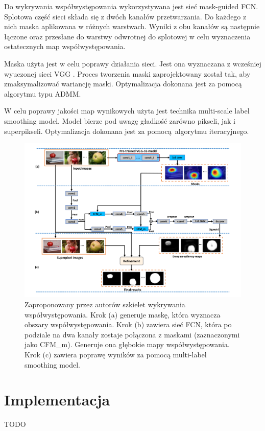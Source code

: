 \documentclass[a4paper,11pt, notitlepage, twosides, openany ]{report}
\begin{document}
	

	Do wykrywania współwystępowania wykorzystywana jest sieć mask-guided FCN. Splotowa część sieci składa się z dwóch kanałów przetwarzania. Do każdego z nich maska aplikowana w różnych warstwach. Wyniki z obu kanałów są następnie łączone oraz przesłane do warstwy odwrotnej do splotowej w celu wyznaczenia ostatecznych map współwystępowania.
	
	Maska użyta jest w celu poprawy działania sieci. Jest ona wyznaczana z wcześniej wyuczonej sieci VGG \cite{SimonyanZ14a}. Proces tworzenia maski zaprojektowany został tak, aby zmaksymalizować wariancję maski. Optymalizacja dokonana jest za pomocą algorytmu typu ADMM.

	W celu poprawy jakości map wynikowych użyta jest technika multi-scale label smoothing model. Model bierze pod uwagę gładkość zarówno pikseli, jak i superpikseli. Optymalizacja dokonana jest za pomocą algorytmu iteracyjnego.

	\begin{figure}[h!]
		\centering
		\includegraphics[width=1\textwidth]{fram.png}
		\caption{Zaproponowany przez autorów szkielet wykrywania współwystępowania. Krok (a) generuje maskę, która wyznacza obszary współwystępowania. Krok (b) zawiera sieć FCN, która po podziale na dwa kanały zostaje połączona z maskami (zaznaczonymi jako CFM\_m). Generuje ona głębokie mapy współwystępowania. Krok (c) zawiera poprawę wyników za pomocą multi-label smoothing model.}
		\label{fram}
	\end{figure}

	\section{Implementacja}
	TODO

	
	
	
	

	
\end{document}
